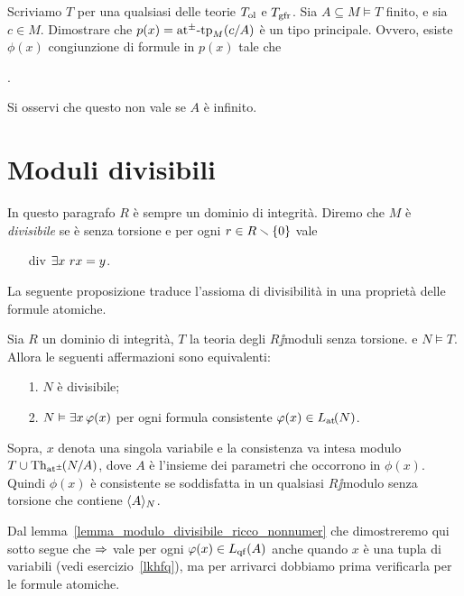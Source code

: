 \begin{exercise}\label{ex_ol+grf_tipi_princ_comp}
Scriviamo $T$ per una qualsiasi delle teorie $T_{\rm ol}$ e $T_{\rm gfr}$. Sia $A\subseteq M\models T$ finito, e sia $c\in M$. Dimostrare che $p(x)=\pmatp_M(c/A)$ \`e un tipo principale. Ovvero, esiste $\phi(x)$ congiunzione di formule in $p(x)$ tale che

.

Si osservi che questo non vale se $A$ \`e infinito.\QED
\end{exercise}




\section{Moduli divisibili}

In questo paragrafo $R$ \`e sempre un dominio di integrit\`a. Diremo che $M$ \`e \emph{divisibile\/} se \`e senza torsione e per ogni  $r\in R\sm \{0\}$ vale
\begin{itemize}
\item[div] $\E x\ rx=y$.
\end{itemize} 

La seguente proposizione traduce l'assioma di divisibilit\`a in una propriet\`a delle formule atomiche.

\begin{proposition}\label{prop_md_cons_sodd}
Sia $R$ un dominio di integrit\`a, $T$ la teoria degli $R\jj$moduli senza torsione. e $N\models T$. Allora le seguenti affermazioni sono equivalenti:
\begin{itemize}
\item[1.] $N$ \`e divisibile;
\item[2.] $N\models\E x\,\phi(x)$ per ogni formula consistente $\phi(x)\in\aL(N)$.
\end{itemize} 
Sopra, $x$ denota una singola variabile e la consistenza va intesa modulo $T\cup\Diag(N/A)$, dove $A$ \`e l'insieme dei parametri che occorrono in $\phi(x)$. Quindi $\phi(x)$ \`e consistente se soddisfatta in un qualsiasi $R\jj$modulo senza torsione che contiene $\<A\>_N$.
\end{proposition}

Dal lemma~\ref{lemma_modulo_divisibile_ricco_nonnumer} che dimostreremo qui sotto segue che $\IMP$ vale per ogni $\phi(x)\in L_{\rm qf}(A)$ anche quando $x$ \`e una tupla di variabili (vedi esercizio~\ref{lkhfq}), ma per arrivarci dobbiamo prima verificarla per le formule atomiche. 

